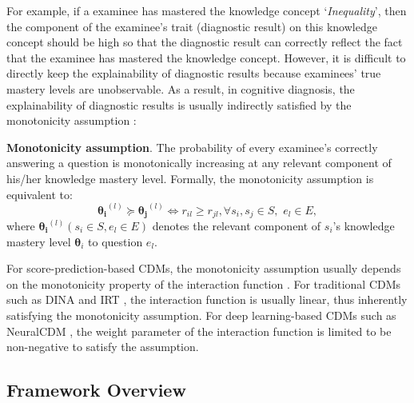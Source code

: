 \documentclass[sigconf]{acmart}
\begin{document}
\par For example, if a examinee has mastered the knowledge concept `\textit{Inequality}', then the component of the examinee's trait (diagnostic result) on this knowledge concept should be high so that the diagnostic result can correctly reflect the fact that the examinee has mastered the knowledge concept. However, it is difficult to directly keep the explainability of diagnostic results because examinees' true mastery levels are unobservable. As a result, in cognitive diagnosis, the explainability of diagnostic results is usually indirectly satisfied by the monotonicity assumption \cite{Reckase2009,WangF2022}:

\vspace{-5pt}
\begin{definition}\label{def:mono}
  \textbf{Monotonicity assumption}. The probability of every examinee's correctly answering a question is monotonically increasing at any relevant component of his/her knowledge mastery level. Formally, the monotonicity assumption is equivalent to:
  \begin{equation}
    \bm{\theta_i}^{(l)} \succeq \bm{\theta_j}^{(l)} \Leftrightarrow r_{il} \geq r_{jl}, \forall s_i, s_j \in S,\,\,e_l \in E,
  \end{equation}
where $\bm{\theta_i}^{(l)} (s_i\in S, e_l\in E)$ denotes the relevant component of $s_i$'s knowledge mastery level $\bm{\theta}_i$ to question $e_l$.
\end{definition}
\vspace{-5pt}

\par For score-prediction-based CDMs, the monotonicity assumption usually depends on the monotonicity property of the interaction function \cite{WangF2022}. For traditional CDMs such as DINA \cite{Torre2009} and IRT \cite{Brzezinska2020}, the interaction function is usually linear, thus inherently satisfying the monotonicity assumption. For deep learning-based CDMs such as NeuralCDM \cite{WangF2022}, the weight parameter of the interaction function is limited to be non-negative to satisfy the assumption.
 
\vspace{-5pt}
\subsection{Framework Overview}\label{sec:Framework Overview}
\end{document}
